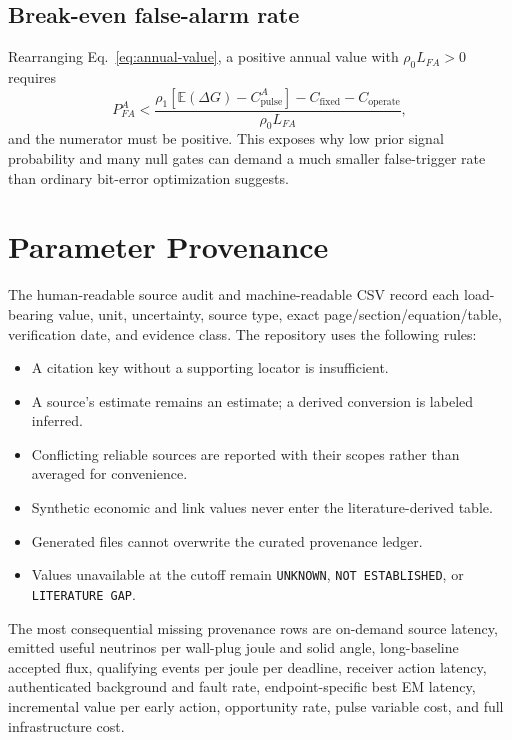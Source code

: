 \documentclass[11pt]{article}
\newcommand{\unknown}{\texttt{UNKNOWN}}
\begin{document}
\subsection{Break-even false-alarm rate}

Rearranging Eq.~\eqref{eq:annual-value}, a positive annual value with $\rho_0L_{FA}>0$ requires
\begin{equation}
P_{FA}^{A}<\frac{\rho_1[\mathbb{E}(\Delta G)-C_{\mathrm{pulse}}^{A}]-C_{\mathrm{fixed}}-C_{\mathrm{operate}}}{\rho_0L_{FA}},
\end{equation}
and the numerator must be positive. This exposes why low prior signal probability and many null gates can demand a much smaller false-trigger rate than ordinary bit-error optimization suggests.

\section{Parameter Provenance}

The human-readable source audit and machine-readable CSV record each load-bearing value, unit, uncertainty, source type, exact page/section/equation/table, verification date, and evidence class. The repository uses the following rules:

\begin{itemize}[leftmargin=*]
  \item A citation key without a supporting locator is insufficient.
  \item A source's estimate remains an estimate; a derived conversion is labeled inferred.
  \item Conflicting reliable sources are reported with their scopes rather than averaged for convenience.
  \item Synthetic economic and link values never enter the literature-derived table.
  \item Generated files cannot overwrite the curated provenance ledger.
  \item Values unavailable at the cutoff remain \unknown, \texttt{NOT ESTABLISHED}, or \texttt{LITERATURE GAP}.
\end{itemize}

The most consequential missing provenance rows are on-demand source latency, emitted useful neutrinos per wall-plug joule and solid angle, long-baseline accepted flux, qualifying events per joule per deadline, receiver action latency, authenticated background and fault rate, endpoint-specific best EM latency, incremental value per early action, opportunity rate, pulse variable cost, and full infrastructure cost.
\end{document}
